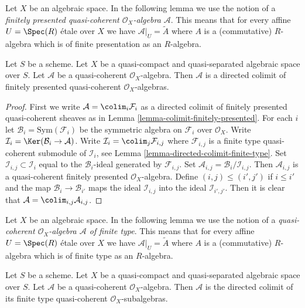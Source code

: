 \noindent
Let $X$ be an algebraic space. In the following lemma we use the notion
of a {\it finitely presented quasi-coherent $\mathcal{O}_X$-algebra
$\mathcal{A}$}. This means that for every affine
$U = \Spec(R)$ \'etale over $X$ we have $\mathcal{A}|_U = \widetilde{A}$
where $A$ is a (commutative) $R$-algebra which is of finite presentation
as an $R$-algebra.

\begin{lemma}
\label{lemma-algebra-directed-colimit-finite-presentation}
Let $S$ be a scheme. Let $X$ be a quasi-compact and quasi-separated
algebraic space over $S$.
Let $\mathcal{A}$ be a quasi-coherent $\mathcal{O}_X$-algebra.
Then $\mathcal{A}$ is a directed colimit of finitely presented
quasi-coherent $\mathcal{O}_X$-algebras.
\end{lemma}

\begin{proof}
First we write $\mathcal{A} = \colim_i \mathcal{F}_i$ as a directed
colimit of finitely presented quasi-coherent sheaves as in
Lemma \ref{lemma-colimit-finitely-presented}.
For each $i$ let $\mathcal{B}_i = \text{Sym}(\mathcal{F}_i)$ be the
symmetric algebra on $\mathcal{F}_i$ over $\mathcal{O}_X$. Write
$\mathcal{I}_i = \Ker(\mathcal{B}_i \to \mathcal{A})$. Write
$\mathcal{I}_i = \colim_j \mathcal{F}_{i, j}$ where
$\mathcal{F}_{i, j}$ is a finite type quasi-coherent submodule of
$\mathcal{I}_i$, see
Lemma \ref{lemma-directed-colimit-finite-type}.
Set $\mathcal{I}_{i, j} \subset \mathcal{I}_i$
equal to the $\mathcal{B}_i$-ideal generated by $\mathcal{F}_{i, j}$.
Set $\mathcal{A}_{i, j} = \mathcal{B}_i/\mathcal{I}_{i, j}$.
Then $\mathcal{A}_{i, j}$ is a quasi-coherent finitely presented
$\mathcal{O}_X$-algebra. Define $(i, j) \leq (i', j')$ if
$i \leq i'$ and the map $\mathcal{B}_i \to \mathcal{B}_{i'}$
maps the ideal $\mathcal{I}_{i, j}$ into the ideal $\mathcal{I}_{i', j'}$.
Then it is clear that $\mathcal{A} = \colim_{i, j} \mathcal{A}_{i, j}$.
\end{proof}

\noindent
Let $X$ be an algebraic space. In the following lemma we use the notion
of a {\it quasi-coherent $\mathcal{O}_X$-algebra $\mathcal{A}$
of finite type}. This means that for every affine
$U = \Spec(R)$ \'etale over $X$ we have $\mathcal{A}|_U = \widetilde{A}$
where $A$ is a (commutative) $R$-algebra which is of finite type
as an $R$-algebra.

\begin{lemma}
\label{lemma-algebra-directed-colimit-finite-type}
Let $S$ be a scheme. Let $X$ be a quasi-compact and quasi-separated algebraic
space over $S$. Let $\mathcal{A}$ be a quasi-coherent $\mathcal{O}_X$-algebra.
Then $\mathcal{A}$ is the directed colimit of its finite type
quasi-coherent $\mathcal{O}_X$-subalgebras.
\end{lemma}

